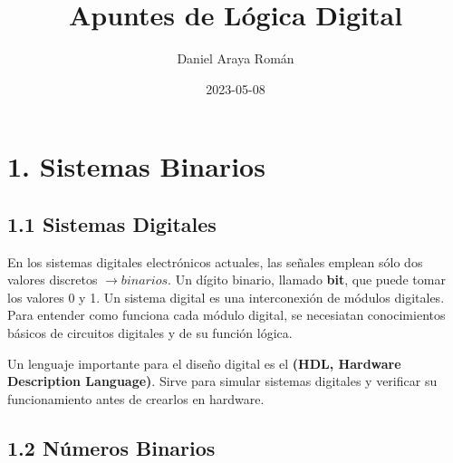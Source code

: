 \documentclass{article}
\title{Apuntes de L\'{o}gica Digital}
\date{2023-05-08}
\author{Daniel Araya Rom\'{a}n}
\begin{document}
\maketitle
\newpage

\section*{1. Sistemas Binarios}

\paragraph*{}
\normalsize

\subsection*{1.1 Sistemas Digitales}

En los sistemas digitales electr\'{o}nicos actuales,
las se\~{n}ales emplean s\'{o}lo dos valores discretos
$\rightarrow binarios$. Un d\'{i}gito binario, llamado
\textbf{bit}, que puede tomar los valores 0 y 1.
Un sistema digital es una interconexi\'{o}n de m\'{o}dulos
digitales. Para entender como funciona cada m\'{o}dulo digital,
se necesiatan conocimientos b\'{a}sicos de circuitos digitales
y de su funci\'{o}n l\'{o}gica.

Un lenguaje importante para el dise\~{n}o digital es el \textbf{(HDL,
Hardware Description Language)}. Sirve para simular sistemas digitales
y verificar su funcionamiento antes de crearlos en hardware.
\medskip

\begin{center}
\end{center}
\medskip

\subsection*{1.2 N\'{u}meros Binarios}

\paragraph*{}
\normalsize
\end{document}
